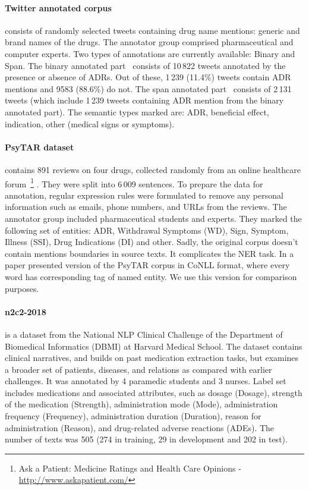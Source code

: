 \documentclass[a4paper,fleqn,longmktitle]{cas-dc}
\begin{document}
\paragraph{Twitter annotated corpus~\cite{sarker2016social}} consists of randomly selected tweets containing drug name mentions: generic and brand names of the drugs. The annotator group comprised pharmaceutical and computer experts. Two types of annotations are currently available: Binary and Span. The binary annotated part~\cite{sarker2015portable} consists of 10\,822 tweets annotated by the presence or absence of ADRs. Out of these, 1\,239 (11.4\%) tweets contain ADR mentions and 9583 (88.6\%) do not. 
The span annotated part~\cite{sarker2016social} consists of 2\,131 tweets (which include 1\,239 tweets containing ADR mention from the binary annotated part). The semantic types marked are: ADR, beneficial effect, indication, other (medical signs or symptoms). 

\paragraph{PsyTAR dataset~\cite{zolnoori2019psytar}} contains 891 reviews on four drugs, collected randomly from an online healthcare forum~\footnote{Ask a Patient: Medicine Ratings and Health Care Opinions - \url{http://www.askapatient.com/}}
. They were split into 6\,009 sentences. To prepare the data for annotation, regular expression rules were formulated to remove any personal information such as emails, phone numbers, and URLs from the reviews. The annotator group included pharmaceutical students and experts. They marked the following set of entities: ADR, Withdrawal Symptoms (WD), Sign, Symptom, Illness (SSI), Drug Indications (DI) and other. Sadly, the original corpus doesn't contain mentions boundaries in source texts. It complicates the NER task. In a paper \cite{basaldella2019bioreddit} presented version of the PsyTAR corpus in CoNLL format, where every word has corresponding tag of named entity. We use this version for comparison purposes.

\paragraph{n2c2-2018~\cite{n2c2-2018}}
 is a dataset from the National NLP Clinical Challenge of the Department of Biomedical Informatics (DBMI) at Harvard Medical School. 
The dataset contains clinical narratives, and builds on past medication extraction tasks, but examines a broader set of patients, diseases, and relations as compared with earlier challenges. 
It was annotated by 4 paramedic students and 3 nurses. Label set includes medications and associated attributes, such as dosage (Dosage), strength of the medication (Strength), administration mode (Mode), administration frequency (Frequency), administration duration (Duration), reason for administration (Reason), and drug-related adverse reactions (ADEs).
The number of texts was 505 (274 in training, 29 in development and 202 in test).
\end{document}
